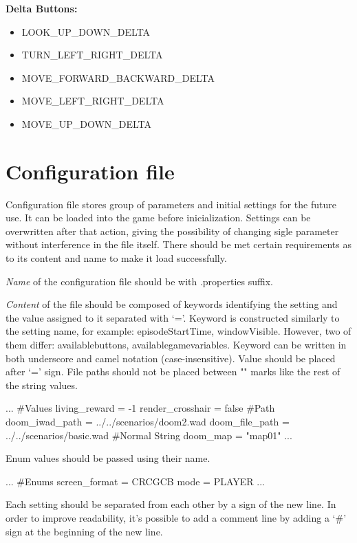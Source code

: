\vspace{20pt}
\textbf{Delta Buttons:}
\begin{itemize} 
	 \item LOOK\_UP\_DOWN\_DELTA
	 \item TURN\_LEFT\_RIGHT\_DELTA
	 \item MOVE\_FORWARD\_BACKWARD\_DELTA
	 \item MOVE\_LEFT\_RIGHT\_DELTA
	 \item MOVE\_UP\_DOWN\_DELTA
\end{itemize}

\section{Configuration file}\label{sec:configuration_file}

	Configuration file stores group of parameters and initial settings for the future use. It can be loaded into the game before inicialization. Settings can be overwritten after that action, giving the possibility of changing sigle parameter without interference in the file itself. There should be met certain requirements as to its content and name to make it load successfully.


	\emph{Name} of the configuration file should be with .properties suffix.

	\emph{Content} of the file should be composed of keywords identifying the setting and the value assigned to it separated with `='. Keyword is constructed similarly to the setting name, for example: episodeStartTime, windowVisible. However, two of them differ: availablebuttons, availablegamevariables.
Keyword can be written in both underscore and camel notation (case-insensitive). 
	Value should be placed after `=' sign. File paths should not be placed between "" marks like the rest of the string values.
\begin{pblock}
...
#Values
living_reward = -1
render_crosshair = false
#Path
doom_iwad_path = ../../scenarios/doom2.wad
doom_file_path = ../../scenarios/basic.wad
#Normal String
doom_map = "map01"
...
\end{pblock}

	Enum values should be passed using their name.


\begin{pblock}
...
#Enums
screen_format = CRCGCB
mode = PLAYER
...
\end{pblock}

	Each setting should be separated from each other by a sign of the new line. In order to improve readability, it's possible to add a comment line by adding a `\#' sign at the beginning of the new line.

